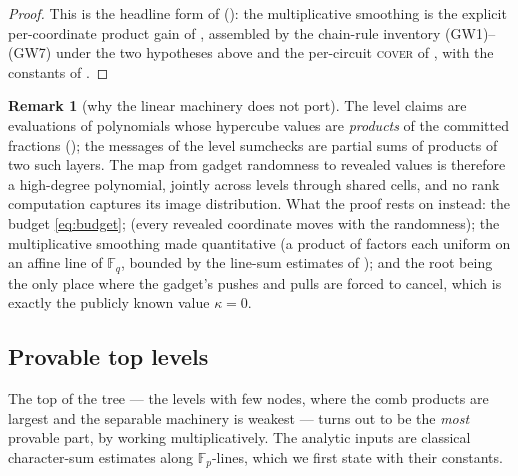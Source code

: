 \documentclass{article}
\newcommand{\Fp}{\mathbb{F}_p}
\newcommand{\Fq}{\mathbb{F}_q}
\theoremstyle{definition}
\newtheorem{remark}[theorem]{Remark}
\begin{document}
\begin{proof}
This is the headline form of  (): the multiplicative smoothing is the explicit per-coordinate product gain of , assembled by the chain-rule inventory (GW1)--(GW7) under the two hypotheses above and the per-circuit \textsc{cover} of , with the constants of .
\end{proof}

\begin{remark}[why the linear machinery does not port]\label{rem:nonlinear}
The level claims are evaluations of polynomials whose hypercube values are \emph{products} of the committed fractions (); the messages of the level sumchecks are partial sums of products of two such layers. The map from gadget randomness to revealed values is therefore a high-degree polynomial, jointly across levels through shared cells, and no rank computation captures its image distribution. What the proof rests on instead: the budget \cref{eq:budget};  (every revealed coordinate moves with the randomness); the multiplicative smoothing made quantitative (a product of factors each uniform on an affine line of $\Fq$, bounded by the line-sum estimates of ); and the root being the only place where the gadget's pushes and pulls are forced to cancel, which is exactly the publicly known value $\kappa = 0$.
\end{remark}

\subsection{Provable top levels}\label{sec:gkr-top}

The top of the tree --- the levels with few nodes, where the comb products are largest and the separable machinery is weakest --- turns out to be the \emph{most} provable part, by working multiplicatively. The analytic inputs are classical character-sum estimates along $\Fp$-lines, which we first state with their constants.
\end{document}
